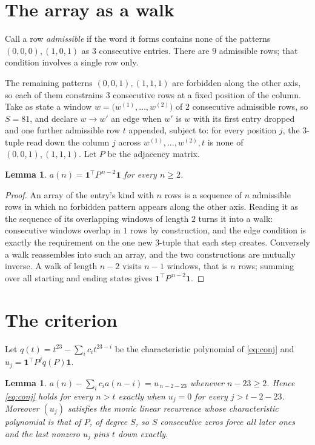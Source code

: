 \documentclass[11pt,a4paper]{article}
\theoremstyle{plain}
\newtheorem{lemma}[theorem]{Lemma}
\theoremstyle{definition}
\begin{document}
\section{The array as a walk}

Call a row \emph{admissible} if the word it forms contains none of the patterns
$(0,0,0), (1,0,1)$ as $3$ consecutive entries. There are $9$ admissible rows; that condition
involves a single row only.

The remaining patterns $(0,0,1), (1,1,1)$ are forbidden along the other axis, so each of them
constrains $3$ consecutive rows at a fixed position of the column. Take as state a
window $w=\bigl(w^{(1)},\dots,w^{(2)}\bigr)$ of $2$ consecutive admissible
rows, so $S=81$, and declare $w\to w'$ an edge when $w'$ is $w$ with its first entry
dropped and one further admissible row $t$ appended, subject to: for every position
$j$, the $3$-tuple read down the column $j$ across $w^{(1)},\dots,w^{(2)},t$
is none of $(0,0,1), (1,1,1)$. Let $P$ be the adjacency matrix.

\begin{lemma}\label{lem:walk}
$a(n)=\mathbf{1}^{\!\top}P^{\,n-2}\mathbf{1}$ for every $n\ge2$.
\end{lemma}

\begin{proof}
An array of the entry's kind with $n$ rows is a sequence of $n$ admissible rows in
which no forbidden pattern appears along the other axis. Reading it as the sequence of its
overlapping windows of length $2$ turns it into a walk: consecutive windows overlap in
$1$ rows by construction, and the edge condition is exactly the requirement on the one
new $3$-tuple that each step creates. Conversely a walk reassembles into such an array,
and the two constructions are mutually inverse. A walk of length $n-2$ visits $n-1$
windows, that is $n$ rows; summing over all starting and ending states gives
$\mathbf{1}^{\!\top}P^{\,n-2}\mathbf{1}$.
\end{proof}

\section{The criterion}

Let $q(t)=t^{23}-\sum_i c_i t^{23-i}$ be the characteristic polynomial of
\eqref{eq:conj} and $u_j=\mathbf{1}^{\!\top}P^{j}q(P)\mathbf{1}$.

\begin{lemma}\label{lem:crit}
$a(n)-\sum_i c_i a(n-i)=u_{\,n-2-23}$ whenever $n-23\ge2$. Hence
\eqref{eq:conj} holds for every $n>t$ exactly when $u_j=0$ for every
$j>t-2-23$. Moreover $(u_j)$ satisfies the monic linear recurrence whose
characteristic polynomial is that of $P$, of degree $S$, so $S$ consecutive zeros force all
later ones and the last nonzero $u_j$ pins $t$ down exactly.
\end{lemma}
\end{document}
